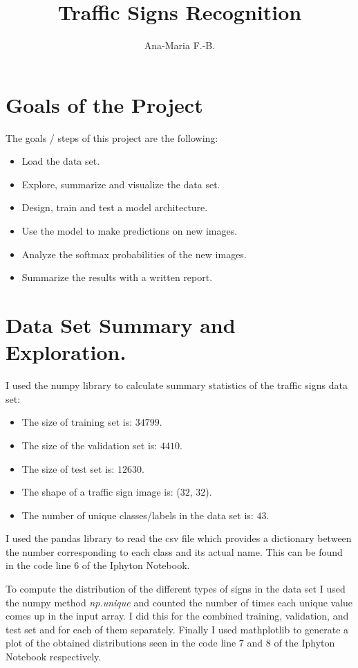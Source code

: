 \documentclass[11pt, a4paper]{amsart}
\title{Traffic Signs Recognition}
\author{Ana-Maria F.-B.}
\date{}
\begin{document}
	\maketitle
	
	\section{Goals of the Project}

The goals / steps of this project are the following:
\begin{itemize}
\item{Load the data set. }
\item{Explore, summarize and visualize the data set.}
\item{Design, train and test a model architecture.}
\item{Use the model to make predictions on new images.}
\item{Analyze the softmax probabilities of the new images.}
\item{Summarize the results with a written report.}

\end{itemize}


		
        	\section{Data Set Summary and Exploration.}
	
I used the numpy library to calculate summary statistics of the traffic signs data set:
\begin{itemize}
\item The size of training set is: $34799$. 
\item The size of the validation set is: $4410$.
\item The size of test set is: $12630$.
\item The shape of a traffic sign image is: ($32$, $32$).
\item The number of unique classes/labels in the data set is: $43$.
\end{itemize}	

I used the pandas library to read the csv file which provides a dictionary between the number corresponding to each class and its actual name. This can be found in the code line $6$ of the Iphyton Notebook. 

To compute the distribution of the different types of signs in the data set I used the numpy method \textit{np.unique} and counted the number of times each unique value comes up in the input array. I did this for the combined training, validation, and test set and for each of them separately. Finally I used mathplotlib to generate a plot of the obtained distributions seen in the code line $7$ and $8$ of the Iphyton Notebook respectively. 
\end{document}
